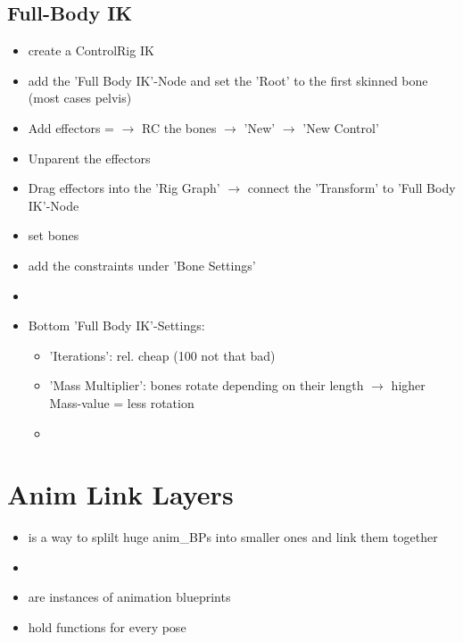         \subsection{Full-Body IK}
            \begin{itemize}
                \item create a ControlRig IK
                \item add the 'Full Body IK'-Node and set the 'Root' to the first skinned bone (most cases pelvis)
                \item Add effectors = $\rightarrow$ RC the bones $\rightarrow$ 'New' $\rightarrow$ 'New Control'
                \item Unparent the effectors
                \item Drag effectors into the 'Rig Graph' $\rightarrow$ connect the 'Transform' to 'Full Body IK'-Node
                \item set bones
                \item add the constraints under 'Bone Settings'
                \item 
                \item Bottom 'Full Body IK'-Settings:
                \begin{itemize}
                    \item 'Iterations': rel. cheap (100 not that bad)
                    \item 'Mass Multiplier': bones rotate depending on their length $\rightarrow$ higher Mass-value = less rotation
                    \item 
                \end{itemize}
            \end{itemize}


    \section{Anim Link Layers}
        \begin{itemize}
            \item is a way to splilt huge anim\_BPs into smaller ones and link them together
            \item 
            \item are instances of animation blueprints
            \item hold functions for every pose
        \end{itemize}

